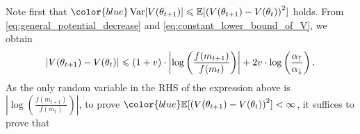 \documentclass[journal]{IEEEtran}
\DeclareMathOperator{\Var}{Var}   %
\providecommand{\E}{\mathbb{E}} %
\renewcommand{\leq}{\leqslant} %
\DeclarePairedDelimiter{\abs}{\lvert}{\rvert}
\theoremstyle{definition}
\newcommand{\aup}{\alpha_{\uparrow}}
\newcommand{\adown}{\alpha_{\downarrow}}
\begin{document}
Note first that
${\color{blue}
\Var[V(\theta_{t+1})]
\leq
\E[\left(V(\theta_{t+1}) - V(\theta_t)\right)^2]}$
%
holds. 
From \eqref{eq:general_potential_decrease} and \eqref{eq:constant_lower_bound_of_V}, 
we obtain
\begin{equation}
\abs{V(\theta_{t+1}) - V(\theta_t)}
\leq
\left(1+v\right)\cdot\left|\log\left(\frac{f(m_{t+1})}{f(m_t)}\right)\right|
+2v\cdot\log\left(\frac{\aup}{\adown}\right)
.
\end{equation}
%
As the only random variable in the RHS of the expression above is $\left|\log\left(\frac{f(m_{t+1})}{f(m_t)}\right)\right|$,
to prove ${\color{blue}\E[\left(V(\theta_{t+1}) - V(\theta_t)\right)^2]} < \infty$, it suffices to prove that
\end{document}
